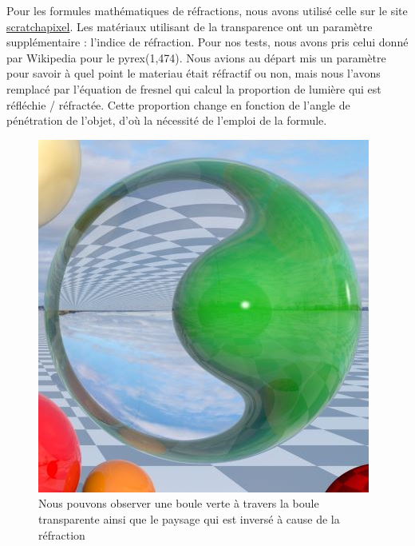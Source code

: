 Pour les formules mathématiques de réfractions, nous avons utilisé celle sur le site \href{https://www.scratchapixel.com/lessons/3d-basic-rendering/introduction-to-shading/reflection-refraction-fresnel}{scratchapixel}.
Les matériaux utilisant de la transparence ont un paramètre supplémentaire : l'indice de réfraction. Pour nos tests, nous avons pris celui donné par Wikipedia pour le pyrex(1,474). Nous avions au départ mis un paramètre pour savoir à quel point le materiau était réfractif ou non, mais nous l'avons remplacé par l'équation de fresnel qui calcul la proportion de lumière qui est réfléchie / réfractée. Cette proportion change en fonction de l'angle de pénétration de l'objet, d'où la nécessité de l'emploi de la formule.

\begin{figure}[h]
   \begin{center}
       \includegraphics[scale=0.8]{img/rt/refractions.jpg}
   \end{center}
   \caption{Nous pouvons observer une boule verte à travers la boule transparente ainsi que le paysage qui est inversé à cause de la réfraction}
\end{figure}
